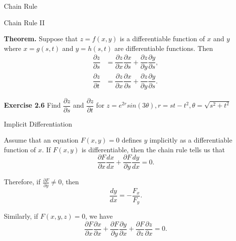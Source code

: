 \documentclass{beamer}
\begin{document}
    \begin{frame}[t]{Chain Rule}
        \begin{block}{Chain Rule II}
            \par \textbf{Theorem.} Suppose that $z =f(x,y)$ is a differentiable function of $x$ and $y$ where $x = g(s,t)$ and $y = h(s,t)$ are differentiable functions. Then 
            \begin{equation*}
                \begin{aligned}
                    \dfrac{\partial z}{\partial s} &= \dfrac{\partial z}{\partial x} \dfrac{\partial x}{\partial s} + \dfrac{\partial z}{\partial y} \dfrac{\partial y}{\partial s} ,\\
                    \dfrac{\partial z}{\partial t} &= \dfrac{\partial z}{\partial x} \dfrac{\partial x}{\partial s} + \dfrac{\partial z}{\partial y} \dfrac{\partial y}{\partial s} .
                \end{aligned}
            \end{equation*}
        \end{block}
        \par \textbf{Exercise 2.6} Find $\dfrac{\partial z}{\partial s}$ and $\dfrac{\partial z}{\partial t}$ for $z = e^{2r}sin(3\theta), r = st - t^2, \theta = \sqrt{s^2+t^2}$
    \end{frame}

    \begin{frame}[t]{Implicit Differentiation}
        \par Assume that an equation $F(x,y) = 0$ defines $y$ implicitly as a differentiable function of $x$. If $F(x,y)$ is differentiable, then the chain rule tells us that 
        \begin{equation*}
            \dfrac{\partial F}{\partial x} \dfrac{d x}{d x} + \dfrac{\partial F}{\partial y} \dfrac{d y}{d x} = 0.
        \end{equation*}
        \par Therefore, if $\frac{\partial F}{\partial y} \neq 0$, then 
        \begin{equation*}
            \dfrac{dy}{dx} = - \dfrac{F_x}{F_y} .
        \end{equation*}
        \par Similarly, if $F(x,y,z) = 0$, we have 
        \begin{equation*}
            \dfrac{\partial F}{\partial x} \dfrac{\partial x}{\partial x} + \dfrac{\partial F}{\partial y} \dfrac{\partial y}{\partial x} + \dfrac{\partial F}{\partial z} \dfrac{\partial z}{\partial x} = 0.
        \end{equation*}
    \end{frame}
    
\end{document}
